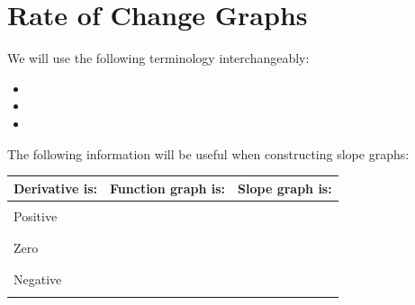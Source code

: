 \documentclass[notes]{subfiles}
\begin{document}
	\fancyhead[LO,RE]{\bfseries  \currentname}
	\fancyfoot[C]{{}}
	\fancyfoot[RO,LE]{\large \thepage}	%


\section*{Rate of Change Graphs}\label{cs26}
	We will use the following terminology interchangeably:
	\begin{itemize}
		\item {}
		\item {}
		\item {}
	\end{itemize}
	The following information will be useful when constructing slope graphs:
		\begin{center}	
			\tabulinesep=3mm
			\begin{tabu}{ | X[.5,c] | X[c] | X[c] |}\hline
				\textbf{Derivative is}: & \textbf{Function graph is}: & \textbf{Slope graph is}:\\ \hline
						& & \\
				Positive	& & \\ 
				 		& & \\ \hline
				 		& & \\
				Zero 	& & \\ 
				 		& & \\ \hline
				 		& & \\
				Negative & & \\ 
						& & \\ \hline				
			\end{tabu}
		\end{center}
		
\end{document}
